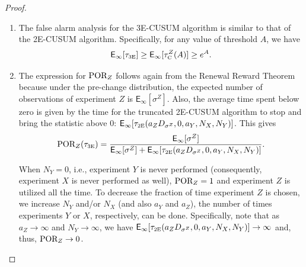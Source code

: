 \documentclass[journal, onecolumn]{IEEEtran}
\begin{document}
\begin{proof}
\begin{enumerate}
\item The false alarm analysis for the 3E-CUSUM algorithm is similar to that of the 2E-CUSUM algorithm. Specifically, for any value of threshold $A$, we have
$$ \mathsf{E}_\infty [\tau_{\textup{\fontsize{6 pt}{10 pt}\selectfont 3E}}] \geq \mathsf{E}_\infty [\tau_{\textup{\fontsize{6 pt}{10 pt}\selectfont C}}^Z (A)] \geq e^A. $$

\item The expression for $\textup{POR}_Z$ follows again from the Renewal Reward Theorem because under the pre-change distribution, the expected number of observations of experiment $Z$ is $\mathsf{E}_\infty [\sigma^Z]$. Also, the average time spent below zero is given by the time for the truncated 2E-CUSUM algorithm to stop and bring the statistic above $0$: $\mathsf{E}_\infty [\tau_{\textup{\fontsize{6 pt}{10 pt}\selectfont 2E}}(a_Z D_{\sigma^Z}, 0, a_Y, N_X, N_Y)]$. This gives
\begin{align*}
\textup{POR}_Z (\tau_{\textup{\fontsize{6 pt}{10 pt}\selectfont 3E}})  = \frac{\mathsf{E}_\infty [\sigma^Z]}{\mathsf{E}_\infty [\sigma^Z] + \mathsf{E}_\infty [\tau_{\textup{\fontsize{6 pt}{10 pt}\selectfont 2E}}(a_Z D_{\sigma^Z}, 0, a_Y, N_X, N_Y)]}.
\end{align*}

When $N_Y = 0$, i.e., experiment $Y$ is never performed (consequently, experiment $X$ is never performed as well), $\textup{POR}_Z = 1$ and experiment $Z$ is utilized all the time. To decrease the fraction of time experiment $Z$ is chosen, we increase $N_Y$ and/or $N_X$ (and also $a_Y$ and $a_Z$), the number of times experiments $Y$ or $X$, respectively, can be done. Specifically, note that as $a_Z \to \infty$ and $N_Y \to \infty$, we have $\mathsf{E}_\infty [\tau_{\textup{\fontsize{6 pt}{10 pt}\selectfont 2E}}(a_Z D_{\sigma^Z}, 0, a_Y, N_X, N_Y)] \to \infty$ and, thus, $\textup{POR}_Z \to 0$.

\medskip


\end{enumerate}
\end{proof}
\end{document}
